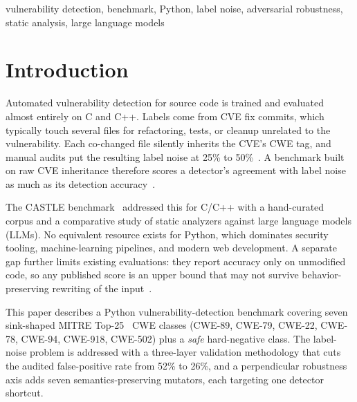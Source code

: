 \documentclass[conference]{IEEEtran}
\begin{document}
\begin{IEEEkeywords}
vulnerability detection, benchmark, Python, label noise, adversarial
robustness, static analysis, large language models
\end{IEEEkeywords}

\section{Introduction}
Automated vulnerability detection for source code is trained and
evaluated almost entirely on C and C++. Labels come from CVE fix commits,
which typically touch several files for refactoring, tests, or cleanup
unrelated to the vulnerability. Each co-changed file silently inherits the
CVE's CWE tag, and manual audits put the resulting label noise at 25\% to
50\%~\cite{croft,cleanvul}. A benchmark built on raw CVE inheritance
therefore scores a detector's agreement with label noise as much as its
detection accuracy~\cite{primevul}.

The CASTLE benchmark~\cite{castle} addressed this for C/C++ with a
hand-curated corpus and a comparative study of static analyzers against
large language models (LLMs). No equivalent resource exists for Python,
which dominates security tooling, machine-learning pipelines, and modern
web development. A separate gap further limits existing evaluations: they
report accuracy only on unmodified code, so any published score is an
upper bound that may not survive behavior-preserving rewriting of the
input~\cite{secllmholmes}.

This paper describes a Python vulnerability-detection benchmark covering
seven sink-shaped MITRE Top-25~\cite{mitre_top25} CWE classes
(CWE-89, CWE-79, CWE-22, CWE-78, CWE-94, CWE-918, CWE-502) plus a
\emph{safe} hard-negative class. The label-noise problem is addressed with
a three-layer validation methodology that cuts the audited false-positive
rate from 52\% to 26\%, and a perpendicular robustness axis adds seven
semantics-preserving mutators, each targeting one detector shortcut.
\end{document}

